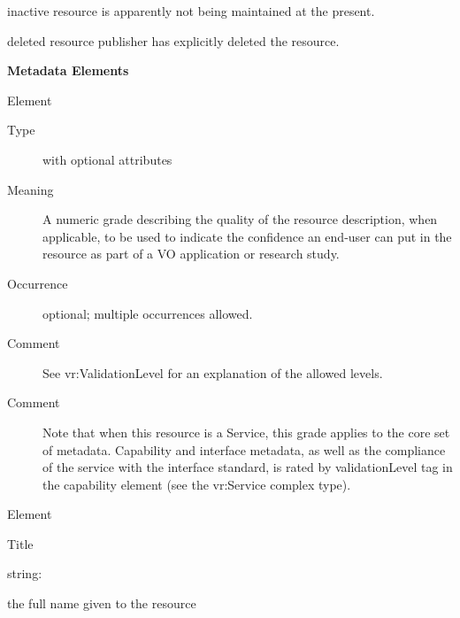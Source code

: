 \documentclass[11pt,a4paper]{ivoa}
\begin{document}
\begin{bigdescription}
\begin{description}
\begin{longtermsdescription}
\item[inactive]
                     resource is apparently not being maintained at the present.
                   
\item[deleted]
                      resource publisher has explicitly deleted the resource.
                   
\end{longtermsdescription}
\end{description}


\end{bigdescription}\endgroup



\vspace{0.5ex}\noindent\textbf{ Metadata Elements}

\begingroup\small\begin{bigdescription}\item[Element \xmlel{validationLevel}]
\begin{description}
\item[Type]  with optional attributes
\item[Meaning] 
                  A numeric grade describing the quality of the
                  resource description, when applicable, 
                  to be used to indicate the confidence an end-user
                  can put in the resource as part of a VO application
                  or research study. 
               
\item[Occurrence] optional; multiple occurrences allowed.
\item[Comment] 
                  See vr:ValidationLevel for an explanation of the
                  allowed levels.  
               
\item[Comment] 
                  Note that when this resource is a Service, this
                  grade applies to the core set of metadata.
                  Capability and interface metadata, as well as the
                  compliance of the service with the interface
                  standard, is rated by validationLevel tag in the 
                  capability element (see the vr:Service complex
                  type).  
               

\end{description}
\item[Element \xmlel{title}]
\begin{description}
Title
\item[Type] string: 
\item[Meaning] 
                  the full name given to the resource
               

\end{description}
\end{bigdescription}
\end{document}
